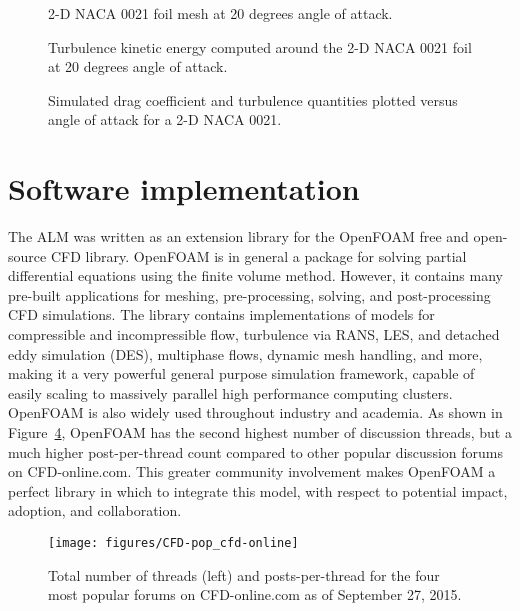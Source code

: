 \begin{figure}[ht]
    \centering
    
    \caption{2-D NACA 0021 foil mesh at 20 degrees angle of attack.}
    
    \label{fig:NACA-foil-mesh}
\end{figure}


\begin{figure}[ht]
    \centering
    
    \caption{Turbulence kinetic energy computed around the 2-D NACA 0021 foil at
        20 degrees angle of attack.}
    
    \label{fig:NACA-foil-k}
\end{figure}


\begin{figure}[ht]
    \centering
    
    \caption{Simulated drag coefficient and turbulence quantities plotted versus
        angle of attack for a 2-D NACA 0021.}
    
    \label{fig:NACA-foil-turbulence}
\end{figure}


\section{Software implementation}

The ALM was written as an extension library for the OpenFOAM free and
open-source CFD library. OpenFOAM is in general a package for solving partial
differential equations using the finite volume method. However, it contains many
pre-built applications for meshing, pre-processing, solving, and post-processing
CFD simulations. The library contains implementations of models for compressible
and incompressible flow, turbulence via RANS, LES, and detached eddy simulation
(DES), multiphase flows, dynamic mesh handling, and more, making it a very
powerful general purpose simulation framework, capable of easily scaling to
massively parallel high performance computing clusters. OpenFOAM is also widely
used throughout industry and academia. As shown in Figure~\ref{fig:cfd-online},
OpenFOAM has the second highest number of discussion threads, but a much higher
post-per-thread count compared to other popular discussion forums on
CFD-online.com. This greater community involvement makes OpenFOAM a perfect
library in which to integrate this model, with respect to potential impact,
adoption, and collaboration.

\begin{figure}[ht]
    \centering
    
    \texttt{[image: figures/CFD-pop\_cfd-online]}
    
    \caption{Total number of threads (left) and posts-per-thread for the four
        most popular forums on CFD-online.com as of September 27, 2015.}
    
    \label{fig:cfd-online}
\end{figure}

